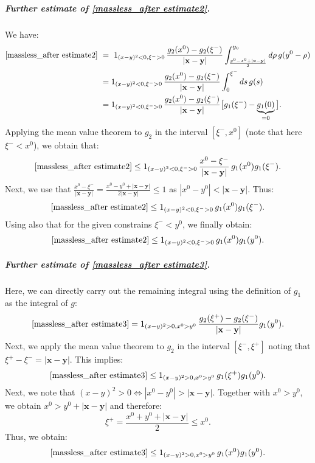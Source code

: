 \documentclass[b5paper,draft,openbib,12pt]{memoir}
\newcommand{\vx}{\mathbf{x}}
\newcommand{\vy}{\mathbf{y}}
\begin{document}
\subparagraph{Further estimate of \eqref{massless_after estimate2}.}
We have:
\begin{align}
	 \eqref{massless_after estimate2} ~&=~ 1_{(x-y)^2 < 0, \xi^- >0} \, \frac{ g_2(x^0) - g_2(\xi^-) }{|\vx-\vy|} \int_{\frac{y^0-x^0+|\vx-\vy|}{2}}^{y_0} d \rho \, g(y^0-\rho) \nonumber\\
&= 1_{(x-y)^2 < 0, \xi^- >0} \, \frac{g_2(x^0) - g_2(\xi^-)}{|\vx-\vy|} \int_{0}^{\xi^-} d s \, g(s)\nonumber\\
&= 1_{(x-y)^2 < 0, \xi^- >0} \, \frac{g_2(x^0) - g_2(\xi^-)}{|\vx-\vy|} \big[ g_1(\xi^-) - \underbrace{g_1(0)}_{=0} \big].
\label{eq:secondline159b}
\end{align}
Applying the mean value theorem to $g_2$ in the interval $[\xi^-,x^0]$ 
(note that here $\xi^-<x^0$), we obtain that:
\begin{equation}
	\eqref{massless_after estimate2} \leq 1_{(x-y)^2 < 0, \xi^- >0} \, \frac{x^0-\xi^-}{|\vx-\vy|}\, g_1(x^0) g_1(\xi^-).
\end{equation}
Next, we use that $\frac{x^0-\xi^-}{|\vx-\vy|}  = \frac{x^0-y^0+|\vx-\vy|}{2|\vx-\vy|} \leq 1$ as $|x^0-y^0| < |\vx-\vy|$. Thus:
\begin{equation}
	\eqref{massless_after estimate2} \leq 1_{(x-y)^2 < 0, \xi^- >0} \, g_1(x^0) g_1(\xi^-).
\end{equation}
Using also that for the given constrains $\xi^- < y^0$, we finally obtain:
\begin{equation}
	\eqref{massless_after estimate2} \leq 1_{(x-y)^2 < 0, \xi^- >0} \, g_1(x^0) g_1(y^0).
\label{eq:resultmasslessafterestimate2}
\end{equation}


\subparagraph{Further estimate of \eqref{massless_after estimate3}.}
Here, we can directly carry out the remaining integral using the definition 
of $g_1$ as the integral of $g$:
\begin{equation}
	\eqref{massless_after estimate3} = 1_{(x-y)^2>0,x^0>y^0}\, \frac{g_2(\xi^+)-g_2(\xi^-)}{|\vx-\vy|} g_1(y^0).
\end{equation}
Next, we apply the mean value theorem to $g_2$ in the interval 
$[\xi^-,\xi^+]$ noting that $\xi^+\!\!-\xi^- = |\vx-\vy|$. This implies:
\begin{equation}
	\eqref{massless_after estimate3} \leq 1_{(x-y)^2>0,x^0>y^0} \,g_1(\xi^+) g_1(y^0).
\end{equation}
Next, we note that $(x-y)^2 > 0 \Leftrightarrow |x^0-y^0| > |\vx-\vy|$. 
Together with $x^0>y^0$, we obtain $x^0>y^0 +|\vx-\vy|$ and therefore:
\begin{equation}
	\xi^+ = \frac{x^0+y^0 +|\vx-\vy|}{2} \leq x^0.
\end{equation}
Thus, we obtain:
\begin{equation}
	\eqref{massless_after estimate3} \leq 1_{(x-y)^2>0,x^0>y^0} \, g_1(x^0) g_1(y^0).
	\label{eq:resultmasslessafterestimate3}
\end{equation}
\end{document}
